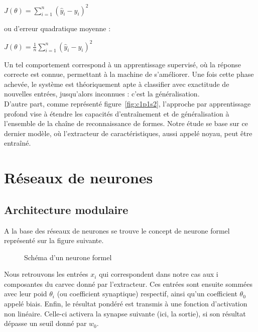 \documentclass[a4paper,10pt]{report}
\begin{document}
\begin{center} $ J({\theta}) =  \sum\limits_{i=1}^{n} (\hat{y}_{i} - y_{i})^2 $ \end{center}

ou d'erreur quadratique moyenne\cite{Bib_WikiMSE} :

\begin{center} $ J({\theta}) =  \frac{1}{n}\sum\limits_{i=1}^{n} (\hat{y}_{i} - y_{i})^2 $ \end{center}

Un tel comportement correspond à un apprentissage supervisé, où la réponse correcte est connue, permettant à la machine de s'améliorer. Une fois cette phase achevée, le système est théoriquement apte à
classifier avec exactitude de nouvelles entrées, jusqu'alors inconnues : c'est la généralisation.
\\

D'autre part, comme représenté figure~\ref{fig:c1p1s2}, l'approche par apprentissage profond vise à étendre les capacités d'entraînement et de généralisation à l'ensemble de la chaîne de reconnaissance de formes.
Notre étude se base sur ce dernier modèle, où l'extracteur de caractéristiques, aussi appelé noyau, peut être entraîné.

\section{Réseaux de neurones}

\subsection{Architecture modulaire}

A la base des réseaux de neurones se trouve le concept de neurone formel représenté sur la figure suivante.
\\
\begin{figure}[H]
    \centering
    \makebox[\textwidth]{}
    \caption{Schéma d'un neurone formel}
    \label{fig:c1p2s1}
\end{figure}

Nous retrouvons les entrées $x_{i}$ qui correspondent dans notre cas aux i composantes du \gls{carvec} donné par l'extracteur.
Ces entrées sont ensuite sommées avec leur poid $\theta_{i}$ (ou coefficient synaptique) respectif, ainsi qu'un coefficient $\theta_{0}$ appelé biais.
Enfin, le résultat pondéré est transmis à une fonction d'activation non linéaire\cite{Bib_WikiAN}. Celle-ci activera la synapse suivante (ici, la sortie), si son résultat dépasse un seuil donné par $w_{0}$.
\\
\end{document}
